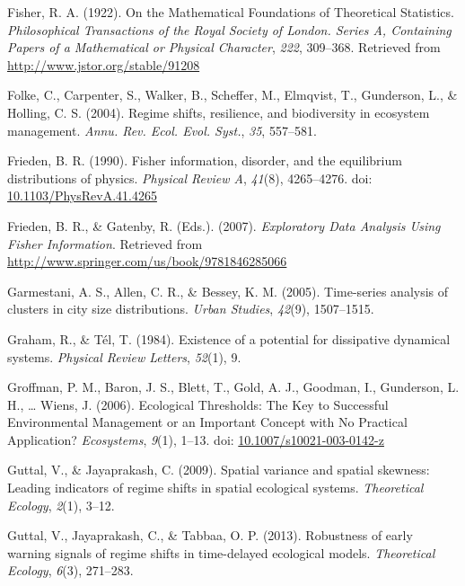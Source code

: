 \documentclass[12pt,twoside,openany]{reedthesis}
\begin{document}
\leavevmode\hypertarget{ref-fisher_mathematical_1922}{}%
Fisher, R. A. (1922). On the Mathematical Foundations of Theoretical Statistics. \emph{Philosophical Transactions of the Royal Society of London. Series A, Containing Papers of a Mathematical or Physical Character}, \emph{222}, 309--368. Retrieved from \url{http://www.jstor.org/stable/91208}

\leavevmode\hypertarget{ref-folke2004regime}{}%
Folke, C., Carpenter, S., Walker, B., Scheffer, M., Elmqvist, T., Gunderson, L., \& Holling, C. S. (2004). Regime shifts, resilience, and biodiversity in ecosystem management. \emph{Annu. Rev. Ecol. Evol. Syst.}, \emph{35}, 557--581.

\leavevmode\hypertarget{ref-frieden_fisher_1990}{}%
Frieden, B. R. (1990). Fisher information, disorder, and the equilibrium distributions of physics. \emph{Physical Review A}, \emph{41}(8), 4265--4276. doi: \href{https://doi.org/10.1103/PhysRevA.41.4265}{10.1103/PhysRevA.41.4265}

\leavevmode\hypertarget{ref-frieden_exploratory_2007}{}%
Frieden, B. R., \& Gatenby, R. (Eds.). (2007). \emph{Exploratory Data Analysis Using Fisher Information}. Retrieved from \url{http://www.springer.com/us/book/9781846285066}

\leavevmode\hypertarget{ref-garmestani2005time}{}%
Garmestani, A. S., Allen, C. R., \& Bessey, K. M. (2005). Time-series analysis of clusters in city size distributions. \emph{Urban Studies}, \emph{42}(9), 1507--1515.

\leavevmode\hypertarget{ref-graham1984existence}{}%
Graham, R., \& Tél, T. (1984). Existence of a potential for dissipative dynamical systems. \emph{Physical Review Letters}, \emph{52}(1), 9.

\leavevmode\hypertarget{ref-groffman_ecological_2006}{}%
Groffman, P. M., Baron, J. S., Blett, T., Gold, A. J., Goodman, I., Gunderson, L. H., \ldots{} Wiens, J. (2006). Ecological Thresholds: The Key to Successful Environmental Management or an Important Concept with No Practical Application? \emph{Ecosystems}, \emph{9}(1), 1--13. doi: \href{https://doi.org/10.1007/s10021-003-0142-z}{10.1007/s10021-003-0142-z}

\leavevmode\hypertarget{ref-guttal2009spatial}{}%
Guttal, V., \& Jayaprakash, C. (2009). Spatial variance and spatial skewness: Leading indicators of regime shifts in spatial ecological systems. \emph{Theoretical Ecology}, \emph{2}(1), 3--12.

\leavevmode\hypertarget{ref-guttal2013robustness}{}%
Guttal, V., Jayaprakash, C., \& Tabbaa, O. P. (2013). Robustness of early warning signals of regime shifts in time-delayed ecological models. \emph{Theoretical Ecology}, \emph{6}(3), 271--283.
\end{document}
